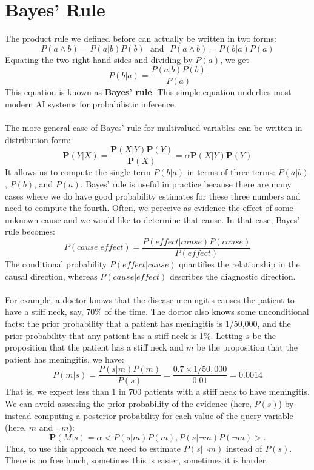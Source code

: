 \section{Bayes' Rule}
The product rule we defined before can actually be written in two forms:
\[P(a \land b) = P(a | b)P(b) \,\,\,\, \text{and} \,\,\,\, P(a \land b) = P(b | a)P(a)\]
Equating the two right-hand sides and dividing by $P(a)$, we get
\[P(b|a) = \frac{P(a|b)P(b)}{P(a)}\]
This equation is known as \textbf{Bayes’ rule}. This simple
equation underlies most modern AI systems for probabilistic inference.\\\\
The more general case of Bayes’ rule for multivalued variables can be written in distribution form:
\[\textbf{P}(Y|X) = \frac{\textbf{P}(X|Y)\textbf{P}(Y)}{\textbf{P}(X)} = \alpha \textbf{P}(X|Y)\textbf{P}(Y)\]
It allows us to compute the single term $P(b | a)$ in terms of three terms: $P(a | b)$, $P(b)$, and $P(a)$. Bayes’ rule is useful in practice because there are many cases where we do have good probability estimates for these three numbers and need to compute the fourth. Often, we perceive as evidence the effect of some unknown cause and we would like to determine that cause. In that case, Bayes’ rule becomes:
\[P(cause|effect) = \frac{P(effect|cause)P(cause)}{P(effect)}\]
The conditional probability $P(effect | cause)$ quantifies the relationship in the causal direction, whereas $P(cause | effect)$ describes the diagnostic direction.\\\\
For example, a doctor knows that the disease meningitis causes the patient to have a stiff neck, say, 70\% of the time.  The doctor also knows some unconditional facts: the prior probability that a patient has meningitis is 1/50,000, and the prior probability that any patient has a stiff neck is 1\%. Letting $s$ be the proposition that the patient has a stiff neck and $m$ be the proposition that the patient has meningitis, we have:
\[P(m|s) = \frac{P(s|m)P(m)}{P(s)} = \frac{0.7 \times 1/50,000}{0.01} = 0.0014\]
That is, we expect less than 1 in 700 patients with a stiff neck to have meningitis. We can avoid assessing the prior probability of the evidence (here, $P(s)$) by instead computing a posterior probability for each value of the query variable (here, $m$ and $\neg m$):
\[\textbf{P}(M | s) = \alpha <P(s | m)P(m), P(s | \neg m)P(\neg m)> .\]
Thus, to use this approach we need to estimate $P(s | \neg m)$ instead of $P(s)$. There is no free lunch, sometimes this is easier, sometimes it is harder.\\\\
